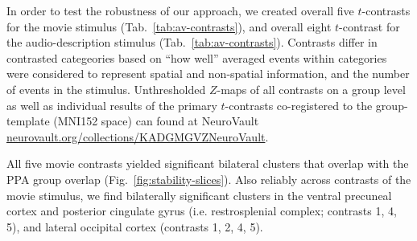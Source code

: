 \documentclass[english]{article}
\begin{document}
In order to test the robustness of our approach, we created overall five
$t$-contrasts for the movie stimulus (Tab.~\ref{tab:av-contrasts}), and overall
eight $t$-contrast for the audio-description stimulus
(Tab.~\ref{tab:av-contrasts}).
Contrasts differ in contrasted categeories based on ``how well'' averaged
events within categories were considered to represent spatial and non-spatial
information, and the number of events in the stimulus.
Unthresholded $Z$-maps of all contrasts on a group level as well as individual
results of the primary $t$-contrasts co-registered to the group-template (MNI152
space) can found at NeuroVault
\href{https://neurovault.org/collections/KADGMGVZ/}{\url{neurovault.org/collections/KADGMGVZNeuroVault}}.


All five movie contrasts yielded significant bilateral clusters that
overlap with the PPA group overlap (Fig.~\ref{fig:stability-slices}).
Also reliably across contrasts of the movie stimulus, we find bilaterally
significant clusters in the ventral precuneal cortex and posterior
cingulate gyrus (i.e. restrosplenial complex; contrasts 1, 4, 5), and lateral
occipital cortex (contrasts 1, 2, 4, 5).

\end{document}
